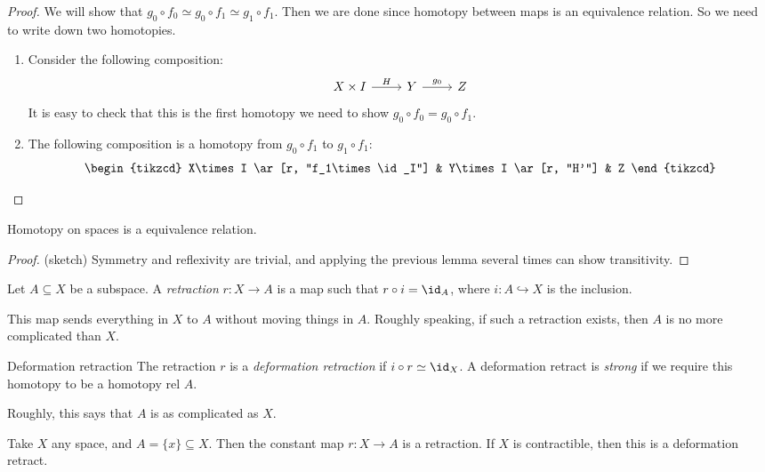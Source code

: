\documentclass[a4paper]{article}
\begin{document}
\begin{proof}
  We will show that $g_0 \circ f_0 \simeq g_0 \circ f_1 \simeq g_1 \circ f_1$. Then we are done since homotopy between maps is an equivalence relation. So we need to write down two homotopies.

  \begin{enumerate}
    \item Consider the following composition:
      \[
        \begin{tikzcd}
          X\times I \ar[r, "H"] & Y \ar[r, "g_0"] & Z
        \end{tikzcd}
      \]
      It is easy to check that this is the first homotopy we need to show $g_0\circ f_0 = g_0 \circ f_1$.
    \item The following composition is a homotopy from $g_0 \circ f_1$ to $g_1 \circ f_1$:
      \[
        \begin{tikzcd}
          X\times I \ar[r, "f_1\times \id_I"] & Y\times I \ar[r, "H'"] & Z
        \end{tikzcd}
      \]
  \end{enumerate}
\end{proof}

\begin{prop}
  Homotopy on spaces is a equivalence relation.
\end{prop}

\begin{proof}(sketch)
  Symmetry and reflexivity are trivial, and applying the previous lemma several times can show transitivity.
\end{proof}

\begin{defi}[Retraction]
  Let $A\subseteq X$ be a subspace. A \emph{retraction} $r: X\to A$ is a map such that $r\circ i = \id_A$, where $i: A\hookrightarrow X$ is the inclusion.
\end{defi}
This map sends everything in $X$ to $A$ without moving things in $A$. Roughly speaking, if such a retraction exists, then $A$ is no more complicated than $X$.

\begin{defi}{Deformation retraction}
  The retraction $r$ is a \emph{deformation retraction} if $i\circ r \simeq \id_X$. A deformation retract is \emph{strong} if we require this homotopy to be a homotopy rel $A$.
\end{defi}
Roughly, this says that $A$ is as complicated as $X$.

\begin{eg}
Take $X$ any space, and $A = \{x\}\subseteq X$. Then the constant map $r: X\to A$ is a retraction. If $X$ is contractible, then this is a deformation retract.
\end{eg}
\end{document}
